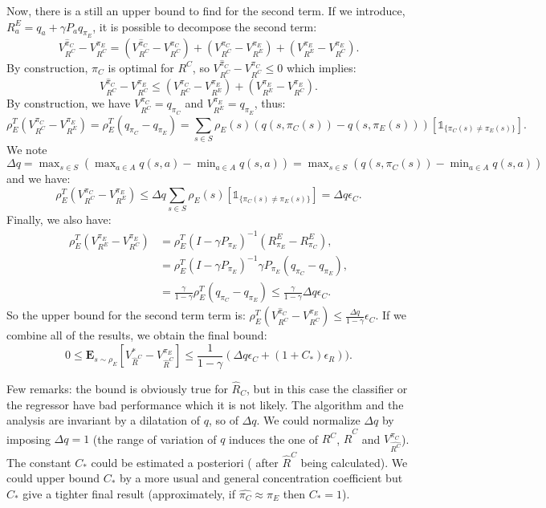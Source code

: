 \documentclass[11pt]{article}
\newcommand{\E}{\mathbf{E}}
\begin{document}
Now, there is a still an upper bound to find for the second term. If we introduce, $R^E_a=q_a+\gamma P_aq_{\pi_E}$, it is possible to decompose the second term:
\begin{equation}
V^{\hat{\pi}_C}_{R^C}-V^{\pi_E}_{R^C}=(V^{\hat{\pi}_C}_{R^C}-V^{\pi_C}_{R^C})+(V^{\pi_C}_{R^C}-V^{\pi_E}_{R^E})+(V^{\pi_E}_{R^E}-V^{\pi_E}_{R^C}).
\end{equation}
By construction, $\pi_C$ is optimal for $R^C$, so $V^{\hat{\pi}_C}_{R^C}-V^{\pi_C}_{R^C}\leq0$ which implies:
\begin{equation}
V^{\hat{\pi}_C}_{R^C}-V^{\pi_E}_{R^C}\leq(V^{\pi_C}_{R^C}-V^{\pi_E}_{R^E})+(V^{\pi_E}_{R^E}-V^{\pi_E}_{R^C}).
\end{equation}
By construction, we have $V^{\pi_C}_{R^C}=q_{\pi_C}$ and $V^{\pi_E}_{R^E}=q_{\pi_E}$, thus:
\begin{equation}
\rho_E^T(V^{\pi_C}_{R^C}-V^{\pi_E}_{R^E})=\rho_E^T(q_{\pi_C}-q_{\pi_E})=\sum_{s\in S}\rho_E(s)(q(s,\pi_C(s))-q(s,\pi_E(s)))[\mathds{1}_{\{\pi_C(s)\neq\pi_E(s)\}}].
\end{equation}
We note $\Delta q=\max_{s\in S}(\max_{a\in A}q(s,a)-\min_{a\in A}q(s,a))=\max_{s\in S}(q(s,\pi_C(s))-\min_{a\in A}q(s,a))$ and we have:
\begin{equation}
\rho_E^T(V^{\pi_C}_{R^C}-V^{\pi_E}_{R^E})\leq\Delta q\sum_{s\in S}\rho_E(s)[\mathds{1}_{\{\pi_C(s)\neq\pi_E(s)\}}]= \Delta q \epsilon_C.
\end{equation}
Finally, we also have:
\begin{align}
\rho_E^T(V^{\pi_E}_{R^E}-V^{\pi_E}_{R^C})&=\rho_E^T(I-\gamma P_{\pi_E})^{-1}(R^E_{\pi_E}-R^E_{\pi_C}),
\\
&=\rho_E^T(I-\gamma P_{\pi_E})^{-1}\gamma P_{\pi_E}(q_{\pi_C}-q_{\pi_E}),
\\
&=\frac{\gamma}{1-\gamma}\rho_E^T(q_{\pi_C}-q_{\pi_E})\leq \frac{\gamma}{1-\gamma}\Delta q \epsilon_C.
\end{align}
So the upper bound for the second term term is: $\rho_E^T(V^{\hat{\pi}_C}_{R^C}-V^{\pi_E}_{R^C})\leq \frac{\Delta q}{1-\gamma}\epsilon_C$.
If we combine all of the results, we obtain the final bound:
\begin{equation}
0\leq\E_{s\sim\rho_E}[V^*_{\hat{R}^C}-V^{\pi_E}_{\hat{R}^C}]\leq \frac{1}{1-\gamma}(\Delta q \epsilon_C+(1+C_*)\epsilon_R)).
\end{equation}

Few remarks: the bound is obviously true for $\hat{R}_C$, but in this case the classifier or the regressor have bad performance which it is not likely. The algorithm and the analysis are invariant by a dilatation of $q$, so of $\Delta q$. We could normalize $\Delta q$ by imposing $\Delta q=1$ (the range of variation of $q$ induces the one of $R^C$, $\hat{R}^C$ and $V^{\pi_C}_{\hat{R^C}}$). The constant $C_*$ could be estimated a posteriori ( after $\hat{R}^C$ being calculated). We could upper bound $C_*$ by a more usual and general concentration coefficient but $C_*$ give a tighter final result (approximately, if $\hat{\pi_C}\approx\pi_E$ then $C_*=1$).
\end{document}
